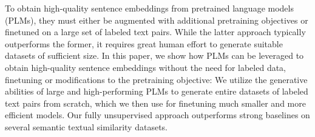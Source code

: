 To obtain high-quality sentence embeddings from pretrained language models (PLMs), they must either be augmented with additional pretraining objectives or finetuned on a large set of labeled text pairs. While the latter approach typically outperforms the former, it requires great human effort to generate suitable datasets of sufficient size. In this paper, we show how PLMs can be leveraged to obtain high-quality sentence embeddings without the need for labeled data, finetuning or modifications to the pretraining objective: We utilize the generative abilities of large and high-performing PLMs to generate entire datasets of labeled text pairs from scratch, which we then use for finetuning much smaller and more efficient models. Our fully unsupervised approach outperforms strong  baselines on several semantic textual similarity datasets.
